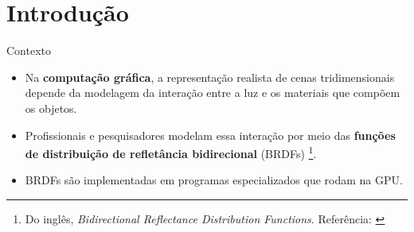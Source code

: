 

\section{Introdução}


\begin{frame}{Contexto}
    \begin{itemize}
        \item Na \textbf{computação gráfica}, a representação realista de cenas tridimensionais depende da modelagem da interação entre a luz e os materiais que compõem os objetos.
        \item Profissionais e pesquisadores modelam essa interação por meio das \textbf{funções de distribuição de refletância bidirecional} (BRDFs) \footnote{\tiny{Do inglês, \textit{Bidirectional Reflectance Distribution Functions}. Referência: \cite{pbr}}}.
        \item BRDFs são implementadas em programas especializados que rodam na GPU.
    \end{itemize}
\end{frame}


